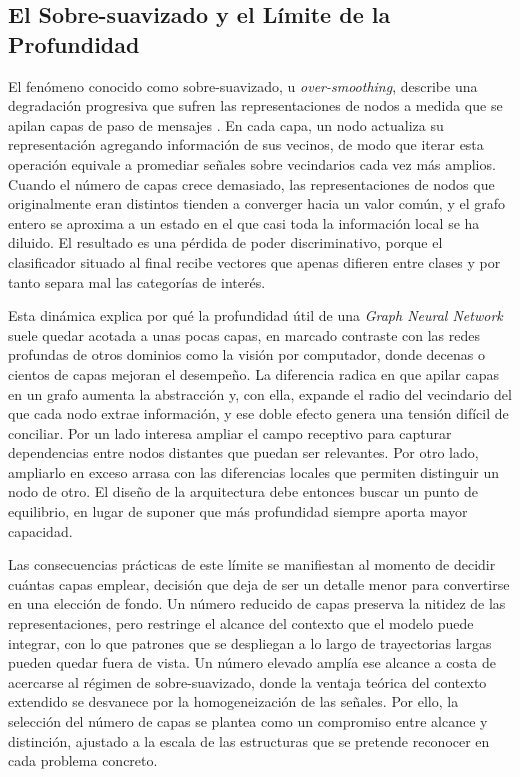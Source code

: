 \subsection{El Sobre-suavizado y el Límite de la Profundidad}

El fenómeno conocido como sobre-suavizado, u \textit{over-smoothing}, describe una degradación progresiva que sufren las representaciones de nodos a medida que se apilan capas de paso de mensajes \cite{Li2018DeeperInsights}. En cada capa, un nodo actualiza su representación agregando información de sus vecinos, de modo que iterar esta operación equivale a promediar señales sobre vecindarios cada vez más amplios. Cuando el número de capas crece demasiado, las representaciones de nodos que originalmente eran distintos tienden a converger hacia un valor común, y el grafo entero se aproxima a un estado en el que casi toda la información local se ha diluido. El resultado es una pérdida de poder discriminativo, porque el clasificador situado al final recibe vectores que apenas difieren entre clases y por tanto separa mal las categorías de interés.

Esta dinámica explica por qué la profundidad útil de una \textit{Graph Neural Network} suele quedar acotada a unas pocas capas, en marcado contraste con las redes profundas de otros dominios como la visión por computador, donde decenas o cientos de capas mejoran el desempeño. La diferencia radica en que apilar capas en un grafo aumenta la abstracción y, con ella, expande el radio del vecindario del que cada nodo extrae información, y ese doble efecto genera una tensión difícil de conciliar. Por un lado interesa ampliar el campo receptivo para capturar dependencias entre nodos distantes que puedan ser relevantes. Por otro lado, ampliarlo en exceso arrasa con las diferencias locales que permiten distinguir un nodo de otro. El diseño de la arquitectura debe entonces buscar un punto de equilibrio, en lugar de suponer que más profundidad siempre aporta mayor capacidad.

Las consecuencias prácticas de este límite se manifiestan al momento de decidir cuántas capas emplear, decisión que deja de ser un detalle menor para convertirse en una elección de fondo. Un número reducido de capas preserva la nitidez de las representaciones, pero restringe el alcance del contexto que el modelo puede integrar, con lo que patrones que se despliegan a lo largo de trayectorias largas pueden quedar fuera de vista. Un número elevado amplía ese alcance a costa de acercarse al régimen de sobre-suavizado, donde la ventaja teórica del contexto extendido se desvanece por la homogeneización de las señales. Por ello, la selección del número de capas se plantea como un compromiso entre alcance y distinción, ajustado a la escala de las estructuras que se pretende reconocer en cada problema concreto.

